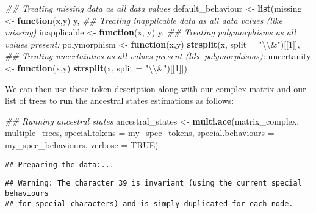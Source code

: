 \documentclass[
]{book}
\newenvironment{Shaded}{\begin{snugshade}}{\end{snugshade}}
\newcommand{\CharTok}[1]{\textcolor[rgb]{0.31,0.60,0.02}{#1}}
\newcommand{\CommentTok}[1]{\textcolor[rgb]{0.56,0.35,0.01}{\textit{#1}}}
\newcommand{\ControlFlowTok}[1]{\textcolor[rgb]{0.13,0.29,0.53}{\textbf{#1}}}
\newcommand{\DataTypeTok}[1]{\textcolor[rgb]{0.13,0.29,0.53}{#1}}
\newcommand{\DecValTok}[1]{\textcolor[rgb]{0.00,0.00,0.81}{#1}}
\newcommand{\KeywordTok}[1]{\textcolor[rgb]{0.13,0.29,0.53}{\textbf{#1}}}
\newcommand{\NormalTok}[1]{#1}
\newcommand{\OtherTok}[1]{\textcolor[rgb]{0.56,0.35,0.01}{#1}}
\newcommand{\StringTok}[1]{\textcolor[rgb]{0.31,0.60,0.02}{#1}}
\begin{document}
\begin{Shaded}
\begin{Highlighting}[]
\CommentTok{\#\# Treating missing data as all data values}
\NormalTok{default\_behaviour \textless{}{-}}\StringTok{ }\KeywordTok{list}\NormalTok{(missing      \textless{}{-}}\StringTok{ }\ControlFlowTok{function}\NormalTok{(x,y) y,}
\CommentTok{\#\# Treating inapplicable data as all data values (like missing)    }
\NormalTok{                          inapplicable \textless{}{-}}\StringTok{ }\ControlFlowTok{function}\NormalTok{(x, y) y,}
\CommentTok{\#\# Treating polymorphisms as all values present:}
\NormalTok{                          polymorphism \textless{}{-}}\StringTok{ }\ControlFlowTok{function}\NormalTok{(x,y) }\KeywordTok{strsplit}\NormalTok{(x, }\DataTypeTok{split =} \StringTok{"}\CharTok{\textbackslash{}\textbackslash{}}\StringTok{\&"}\NormalTok{)[[}\DecValTok{1}\NormalTok{]],}
\CommentTok{\#\# Treating uncertainties as all values present (like polymorphisms):}
\NormalTok{                          uncertanity  \textless{}{-}}\StringTok{ }\ControlFlowTok{function}\NormalTok{(x,y) }\KeywordTok{strsplit}\NormalTok{(x, }\DataTypeTok{split =} \StringTok{"}\CharTok{\textbackslash{}\textbackslash{}}\StringTok{\&"}\NormalTok{)[[}\DecValTok{1}\NormalTok{]])}
\end{Highlighting}
\end{Shaded}

We can then use these token description along with our complex matrix and our list of trees to run the ancestral states estimations as follows:

\begin{Shaded}
\begin{Highlighting}[]
\CommentTok{\#\# Running ancestral states}
\NormalTok{ancestral\_states \textless{}{-}}\StringTok{ }\KeywordTok{multi.ace}\NormalTok{(matrix\_complex, multiple\_trees,}
                              \DataTypeTok{special.tokens =}\NormalTok{ my\_spec\_tokens,}
                              \DataTypeTok{special.behaviours =}\NormalTok{ my\_spec\_behaviours,}
                              \DataTypeTok{verbose =} \OtherTok{TRUE}\NormalTok{)}
\end{Highlighting}
\end{Shaded}

\begin{verbatim}
## Preparing the data:...
\end{verbatim}

\begin{verbatim}
## Warning: The character 39 is invariant (using the current special behaviours
## for special characters) and is simply duplicated for each node.
\end{verbatim}
\end{document}

